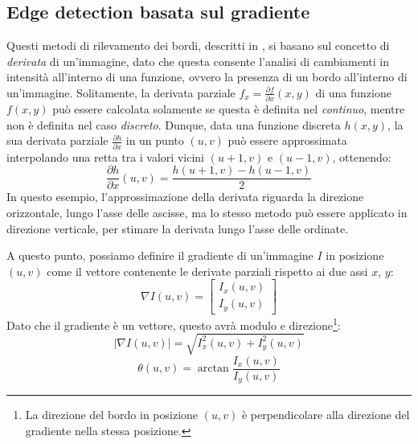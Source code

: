 \subsection{Edge detection basata sul gradiente}
\label{subsec:gradient-based-edge-detection}
Questi metodi di rilevamento dei bordi, descritti in \cite{bib:digital-image-processing}, si basano sul concetto di \textit{derivata} di un'immagine, dato che questa consente l'analisi di cambiamenti in intensit\`a all'interno di una funzione, ovvero la presenza di un bordo all'interno di un'immagine. Solitamente, la derivata parziale $f_{x}=\frac{\partial f}{\partial x}(x, y)$ di una funzione $f(x, y)$ pu\`o essere calcolata solamente se questa \`e  definita nel \textit{continuo}, mentre non \`e definita nel caso \textit{discreto}. Dunque, data una funzione discreta $h(x, y)$, la sua derivata parziale $\frac{\partial h}{\partial x}$ in un punto $(u, v)$ pu\`o essere approssimata interpolando una retta tra i valori vicini $(u + 1, v)$ e $(u - 1, v)$, ottenendo:
\begin{equation}
	\frac{\partial h}{\partial x}(u, v) = \frac{h(u + 1, v) - h(u - 1, v)}{2}
	\label{eq:image-derivative}
\end{equation}
In questo esempio, l'approssimazione della derivata riguarda la direzione orizzontale, lungo l'asse delle ascisse, ma lo stesso metodo pu\`o essere applicato in direzione verticale, per stimare la derivata lungo l'asse delle ordinate.\par
A questo punto, possiamo definire il gradiente di un'immagine $I$ in posizione $(u, v)$ come il vettore contenente le derivate parziali rispetto ai due assi $x$, $y$:
\begin{equation}
	\nabla I(u, v) = 
		\begin{bmatrix}
			I_{x}(u, v) \\ I_{y}(u, v)
		\end{bmatrix}
	\label{eq:image-gradient}
\end{equation}
Dato che il gradiente \`e un vettore, questo avr\`a modulo e direzione\footnote{La direzione del bordo in posizione $(u, v)$ \`e perpendicolare alla direzione del gradiente nella stessa posizione.}:
\begin{equation}
	|\nabla I(u, v)| = \sqrt{I_{x}^{2}(u, v)+I_{y}^{2}(u, v)}
	\label{eq:image-gradient-magnitude}
\end{equation}
\begin{equation}
	\theta (u, v) = \arctan{\frac{I_{x}(u, v)}{I_{y}(u, v)}}
	\label{eq:image-gradient-direction}
\end{equation}\par
